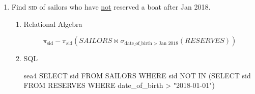 \begin{enumerate}
            \begin{enumerate}
                  \item Relational Algebra
                        \begin{multline*}
                              \pi_{sname}(SAILORS \bowtie RESERVES \bowtie (\sigma_{\text{color} = red}(BOATS))) \; \cap  \\
                              \pi_{sname}(SAILORS \bowtie RESERVES \bowtie (\sigma_{\text{color} = green}(BOATS)))
                        \end{multline*}

                  \item SQL
                        \begin{sqlQuery}{sea3}
                    SELECT DISTINCT S1.sname
                    FROM SAILORS S1, RESERVES R1, BOATS B1,
                    RESERVES R2, BOATS B2
                    WHERE S1.sid = R1.sid 
                        AND R1.bid = B1.bid
                        AND S1.sid = R2.sid 
                        AND R2.bid = B2.bid
                        AND B1.color = "red" 
                        AND B2.color = "green";
                \end{sqlQuery}
            \end{enumerate}

      \item Find \textsc{sid} of sailors who have \underline{not} reserved a boat after Jan 2018.

            \begin{enumerate}
                  \item Relational Algebra

                        \begin{equation*}
                              \pi_{\text{sid}} - \pi_{\text{sid}}(SAILORS \bowtie \sigma_{\text{date\_of\_birth}\; >\; \text{Jan 2018}}(RESERVES))
                        \end{equation*}

                  \item SQL
                        \begin{sqlQuery}{sea4}
                    SELECT sid FROM SAILORS 
                    WHERE sid NOT IN 
                        (SELECT sid FROM RESERVES 
                        WHERE date_of_birth > "2018-01-01")
                    \end{sqlQuery}

            \end{enumerate}


\end{enumerate}
